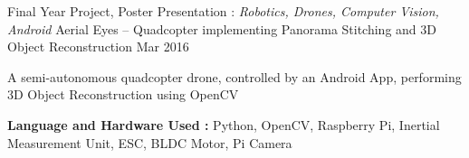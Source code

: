 \begin{cventries}
  \cventry
    {Final Year Project, Poster Presentation : \textit{Robotics, Drones, Computer Vision, Android}} %
    {Aerial Eyes – Quadcopter implementing Panorama Stitching and 3D Object Reconstruction} %
    {} %
    {Mar 2016} %
    {
      \begin{cvitems}
      \item{A semi-autonomous quadcopter drone, controlled by an Android App, performing 3D Object Reconstruction using OpenCV}
      \item{\textbf{Language and Hardware Used :} Python, OpenCV, Raspberry Pi, Inertial Measurement Unit, ESC, BLDC Motor, Pi Camera}
      \end{cvitems}
    }




\end{cventries}

